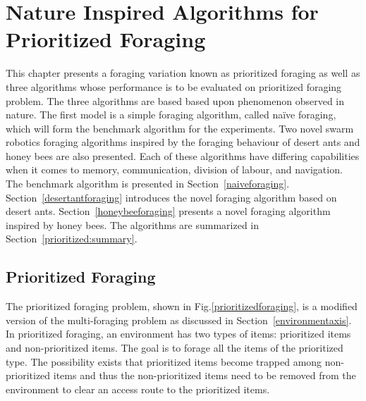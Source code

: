
\chapter{Nature Inspired Algorithms for Prioritized Foraging}
\label{chap:third}


This chapter presents a foraging variation known as prioritized foraging as well as three algorithms whose performance is to be evaluated on prioritized foraging problem. The three algorithms are based based upon phenomenon observed in nature. The first model is a simple foraging algorithm, called na\"ive foraging, which will form the benchmark algorithm for the experiments. Two novel swarm robotics foraging algorithms inspired by the foraging behaviour of desert ants and honey bees are also presented. Each of these algorithms have differing capabilities when it comes to memory, communication, division of labour, and navigation. The benchmark algorithm is presented in Section~\ref{naiveforaging}. Section~\ref{desertantforaging} introduces the novel foraging algorithm based on desert ants. Section~\ref{honeybeeforaging} presents a novel foraging algorithm inspired by honey bees. The algorithms are summarized in Section~\ref{prioritized:summary}.

\section{Prioritized Foraging}
\label{sec:second:prioritizedforaging}


The prioritized foraging problem, shown in Fig.\ref{prioritizedforaging}, is a modified version of the multi-foraging problem as discussed in Section~\ref{environmentaxis}. In prioritized foraging, an environment has two types of items: prioritized items and non-prioritized items. The goal is to forage all the items of the prioritized type. The possibility exists that prioritized items become trapped among non-prioritized items and thus the non-prioritized items need to be removed from the environment to clear an access route to the prioritized items. 

